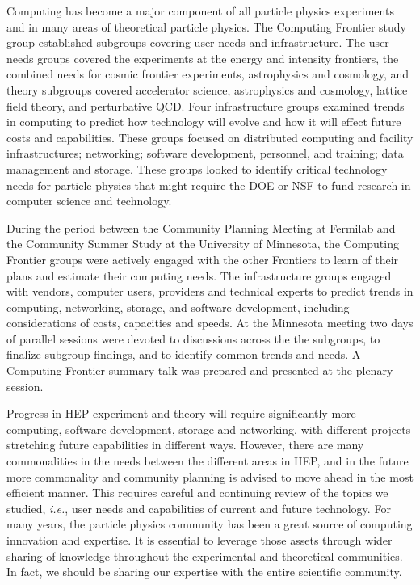 
Computing has become a major component of all particle physics experiments and in many areas of theoretical particle physics. The Computing Frontier study group established subgroups covering user needs and infrastructure. The user needs groups covered the experiments at the energy and intensity frontiers, the combined needs for cosmic frontier experiments, astrophysics and cosmology, and theory subgroups covered accelerator science, astrophysics and cosmology, lattice field theory, and perturbative QCD.  Four infrastructure groups examined trends in computing to predict how technology will evolve and how it will effect future costs and capabilities. These groups focused on distributed computing and facility infrastructures; networking; software development, personnel, and training; data management and storage. These groups looked to identify critical technology needs for particle physics that might require the DOE or NSF to fund research in computer science and technology.

During the period between the Community Planning Meeting at Fermilab and the Community Summer Study at the University of Minnesota, the Computing Frontier groups were actively engaged with the other  Frontiers to learn of their plans and estimate their computing needs.  The infrastructure groups engaged with vendors, computer users, providers and technical experts to predict trends in computing, networking, storage, and software development, including considerations of costs, capacities and speeds.  At the Minnesota meeting two days of parallel sessions were devoted to discussions across the the subgroups, to finalize subgroup findings, and to identify common trends and needs. A Computing Frontier summary talk was prepared and presented at the plenary session.

Progress in HEP experiment and theory will require significantly more computing, software development, storage and networking, with different projects stretching future capabilities in different ways. However, there are many commonalities in the needs between the different areas in HEP, and in the future more commonality and community planning is advised to move ahead in the most efficient manner. This requires careful and continuing review of the topics we studied, {\it i.e.}, user needs and capabilities of current and future technology. For many years, the particle physics community has been a great source of computing innovation and expertise.  It is essential to leverage those assets through wider sharing of knowledge throughout the experimental and theoretical communities.  In fact, we should be sharing our expertise with the entire scientific community.

